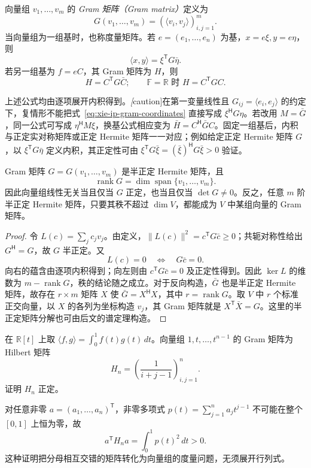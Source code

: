 \begin{definition}
向量组 $v_1,\ldots,v_m$ 的 \emph{Gram 矩阵（Gram matrix）}定义为
\[
G(v_1,\ldots,v_m)=(\langle v_i,v_j\rangle)_{i,j=1}^m.
\]
当向量组为一组基时，也称度量矩阵。若 $e=(e_1,\ldots,e_n)$ 为基，$x=e\xi,y=e\eta$，则
\begin{equation}
\label{eq:xie-ip-gram-coordinates}
\langle x,y\rangle=\xi^{\mathsf T}G\bar\eta.
\end{equation}
若另一组基为 $f=eC$，其 Gram 矩阵为 $H$，则
\begin{equation}
\label{eq:xie-ip-gram-change}
H=C^{\mathsf T}G\bar C;
\qquad \mathbb F=\mathbb R\text{ 时 }H=C^{\mathsf T}GC.
\end{equation}
\end{definition}

上述公式均由逐项展开内积得到。\emph[caution]{在第一变量线性且 $G_{ij}=\langle e_i,e_j\rangle$ 的约定下，复情形不能把式~\eqref{eq:xie-ip-gram-coordinates} 直接写成 $\xi^{\mathsf H}G\eta$。}若改用 $M=\bar G$，同一公式可写成 $\eta^{\mathsf H}M\xi$，换基公式相应变为 $\bar H=C^{\mathsf H}\bar G C$。固定一组基后，内积与正定实对称矩阵或正定 Hermite 矩阵一一对应；例如给定正定 Hermite 矩阵 $G$，以 $\xi^{\mathsf T}G\bar\eta$ 定义内积，其正定性可由 $\xi^{\mathsf T}G\bar\xi=(\bar\xi)^{\mathsf H}G\bar\xi>0$ 验证。

\begin{proposition}
\label{prop:xie-ip-gram-rank}
Gram 矩阵 $G=G(v_1,\ldots,v_m)$ 是半正定 Hermite 矩阵，且
\[
\operatorname{rank}G=\dim\operatorname{span}\{v_1,\ldots,v_m\}.
\]
因此向量组线性无关当且仅当 $G$ 正定，也当且仅当 $\det G\ne0$。反之，任意 $m$ 阶半正定 Hermite 矩阵，只要其秩不超过 $\dim V$，都能成为 $V$ 中某组向量的 Gram 矩阵。
\end{proposition}
\begin{proof}
令 $L(c)=\sum_jc_jv_j$。由定义，$\|L(c)\|^2=c^{\mathsf T}G\bar c\geq0$；共轭对称性给出 $G^{\mathsf H}=G$，故 $G$ 半正定。又
\[
L(c)=0\quad\Longleftrightarrow\quad G\bar c=0.
\]
向右的蕴含由逐项内积得到；向左则由 $c^{\mathsf T}G\bar c=0$ 及正定性得到。因此 $\ker L$ 的维数为 $m-\operatorname{rank}G$，秩的结论随之成立。对于反向构造，$\bar G$ 也是半正定 Hermite 矩阵，故存在 $r\times m$ 矩阵 $X$ 使 $\bar G=X^{\mathsf H}X$，其中 $r=\operatorname{rank}G$。取 $V$ 中 $r$ 个标准正交向量，以 $X$ 的各列为坐标构造 $v_j$，其 Gram 矩阵就是 $X^{\mathsf T}\bar X=G$。这里的半正定矩阵分解也可由后文的谱定理构造。
\end{proof}

\begin{example}
在 $\mathbb R[t]$ 上取 $\langle f,g\rangle=\int_0^1f(t)g(t)\,dt$。向量组 $1,t,\ldots,t^{n-1}$ 的 Gram 矩阵为 Hilbert 矩阵
\[
H_n=\left(\frac1{i+j-1}\right)_{i,j=1}^n.
\]
证明 $H_n$ 正定。
\end{example}
\begin{solve}
对任意非零 $a=(a_1,\ldots,a_n)^{\mathsf T}$，非零多项式 $p(t)=\sum_{j=1}^na_jt^{j-1}$ 不可能在整个 $[0,1]$ 上恒为零，故
\[
a^{\mathsf T}H_na=\int_0^1p(t)^2\,dt>0.
\]
这种证明把分母相互交错的矩阵转化为向量组的度量问题，无须展开行列式。
\end{solve}

